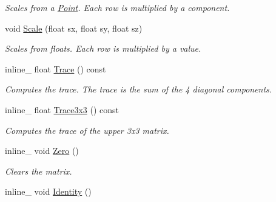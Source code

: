 \begin{DoxyCompactItemize}
\begin{DoxyCompactList}\small\item\em Scales from a \hyperlink{classPoint}{Point}. Each row is multiplied by a component. \end{DoxyCompactList}\item 
void \hyperlink{classMatrix4x4_a693da88056c8a9a5721e99f2a3580ca2}{Scale} (float sx, float sy, float sz)\hypertarget{classMatrix4x4_a693da88056c8a9a5721e99f2a3580ca2}{}\label{classMatrix4x4_a693da88056c8a9a5721e99f2a3580ca2}

\begin{DoxyCompactList}\small\item\em Scales from floats. Each row is multiplied by a value. \end{DoxyCompactList}\item 
inline\+\_\+ float \hyperlink{classMatrix4x4_a89d980f5744d581d314dd5e56e4b0fe3}{Trace} () const \hypertarget{classMatrix4x4_a89d980f5744d581d314dd5e56e4b0fe3}{}\label{classMatrix4x4_a89d980f5744d581d314dd5e56e4b0fe3}

\begin{DoxyCompactList}\small\item\em Computes the trace. The trace is the sum of the 4 diagonal components. \end{DoxyCompactList}\item 
inline\+\_\+ float \hyperlink{classMatrix4x4_a407415d11453cffbac03bcc98671c744}{Trace3x3} () const \hypertarget{classMatrix4x4_a407415d11453cffbac03bcc98671c744}{}\label{classMatrix4x4_a407415d11453cffbac03bcc98671c744}

\begin{DoxyCompactList}\small\item\em Computes the trace of the upper 3x3 matrix. \end{DoxyCompactList}\item 
inline\+\_\+ void \hyperlink{classMatrix4x4_aef42384cd995a5f1b1d7b00e4691614a}{Zero} ()\hypertarget{classMatrix4x4_aef42384cd995a5f1b1d7b00e4691614a}{}\label{classMatrix4x4_aef42384cd995a5f1b1d7b00e4691614a}

\begin{DoxyCompactList}\small\item\em Clears the matrix. \end{DoxyCompactList}\item 
inline\+\_\+ void \hyperlink{classMatrix4x4_a8161800bbc2eb0ea87a6065159cb71a5}{Identity} ()\hypertarget{classMatrix4x4_a8161800bbc2eb0ea87a6065159cb71a5}{}\label{classMatrix4x4_a8161800bbc2eb0ea87a6065159cb71a5}


\end{DoxyCompactItemize}
